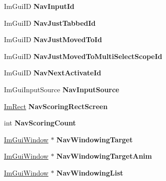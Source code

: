 \begin{DoxyCompactItemize}
Im\+Gui\+ID {\bfseries Nav\+Input\+Id}
\item 
\mbox{\label{structImGuiContext_afe76d25a666183763466ab19cd7d4816}} 
Im\+Gui\+ID {\bfseries Nav\+Just\+Tabbed\+Id}
\item 
\mbox{\label{structImGuiContext_a1ad32892bff3773daf74bf39f525e2c0}} 
Im\+Gui\+ID {\bfseries Nav\+Just\+Moved\+To\+Id}
\item 
\mbox{\label{structImGuiContext_abf4ea3d6c67645b8c7d3b91c05798022}} 
Im\+Gui\+ID {\bfseries Nav\+Just\+Moved\+To\+Multi\+Select\+Scope\+Id}
\item 
\mbox{\label{structImGuiContext_abc1fa0d9750d44d4595905a0ce178ded}} 
Im\+Gui\+ID {\bfseries Nav\+Next\+Activate\+Id}
\item 
\mbox{\label{structImGuiContext_a3054bc5ed01af6c56159cd8de77e7b44}} 
Im\+Gui\+Input\+Source {\bfseries Nav\+Input\+Source}
\item 
\mbox{\label{structImGuiContext_a066c51092023d97383ff348fed5e2a21}} 
\hyperlink{structImRect}{Im\+Rect} {\bfseries Nav\+Scoring\+Rect\+Screen}
\item 
\mbox{\label{structImGuiContext_a2ff237a66a4d995620cc03f309268e53}} 
int {\bfseries Nav\+Scoring\+Count}
\item 
\mbox{\label{structImGuiContext_a90cb834d237027d39e0d2efbe3d90d04}} 
\hyperlink{structImGuiWindow}{Im\+Gui\+Window} $\ast$ {\bfseries Nav\+Windowing\+Target}
\item 
\mbox{\label{structImGuiContext_aaaf83b57ad918ef20a653bc8f5dbcde7}} 
\hyperlink{structImGuiWindow}{Im\+Gui\+Window} $\ast$ {\bfseries Nav\+Windowing\+Target\+Anim}
\item 
\mbox{\label{structImGuiContext_afec14eb3bd7e3a7881fd8def6591cdfe}} 
\hyperlink{structImGuiWindow}{Im\+Gui\+Window} $\ast$ {\bfseries Nav\+Windowing\+List}
\item 
\mbox{\label{structImGuiContext_a412d61294f8c686db6ecc366c845bd08}} 

\end{DoxyCompactItemize}
